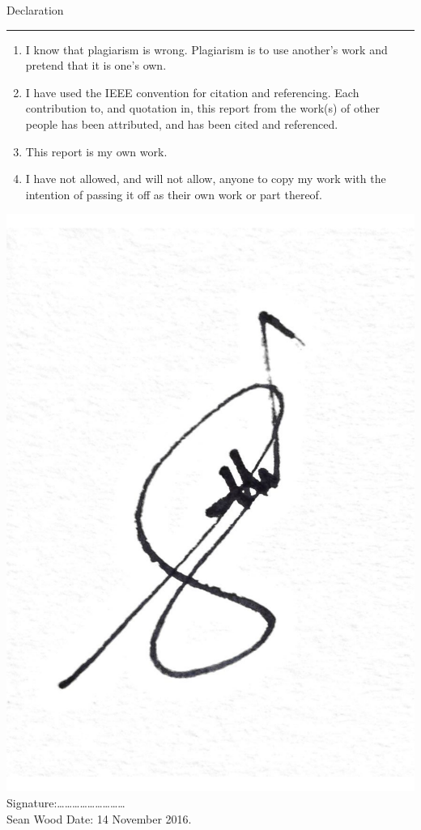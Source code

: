 \thispagestyle{empty}
\vskip 40mm

{\Large Declaration}\\
\hrule

\vskip 10mm
\begin{enumerate}
\item I know that plagiarism is wrong. Plagiarism is to use another's work and pretend that it is one's
own.
\item I have used the IEEE convention for citation and referencing. Each contribution to, and quotation in,
this report from the work(s) of other people has been attributed, and has been cited and
referenced.
\item This report is my own work.
\item I have not allowed, and will not allow, anyone to copy my work with the intention of passing it off
as their own work or part thereof.
\end{enumerate}
\vskip 10mm

\hspace{2cm}\includegraphics[width=0.1\linewidth]{figures/sig.pdf}\\
Signature:\ldots\ldots\ldots\ldots\ldots\ldots\ldots\ldots\ldots 
\\\hspace{2cm}Sean Wood 		%
\vskip10mm
Date: 14 November 2016.


\fancyfoot[C]{\thepage}